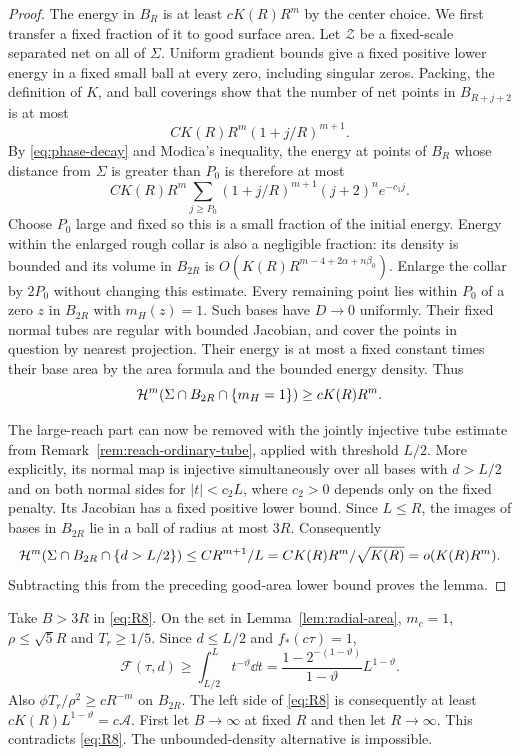 \begin{proof}
The energy in $B_R$ is at least $c K(R)R^m$ by the center choice.
We first transfer a fixed fraction of it to good surface area.
Let $\mathcal Z$ be a fixed-scale separated net on all of $\Sigma$.
Uniform gradient bounds give a fixed positive lower energy in a
fixed small ball at every zero, including singular zeros.
Packing, the definition of $K$, and ball coverings show that the
number of net points in $B_{R+j+2}$ is at most
\[
 C K(R)R^m(1+j/R)^{m+1}.
\]
By \eqref{eq:phase-decay} and Modica's inequality, the energy at
points of $B_R$ whose distance from $\Sigma$ is greater than $P_0$
is therefore at most
\[
 C K(R)R^m\sum_{j\ge P_0}
 (1+j/R)^{m+1}(j+2)^n e^{-c_1j}.
\]
Choose $P_0$ large and fixed so this is a small fraction of the
initial energy. Energy within the enlarged rough collar is also
a negligible fraction: its density is bounded and its volume in
$B_{2R}$ is $O(K(R)R^{m-4+2\alpha+n\beta_0})$.
Enlarge the collar by $2P_0$ without changing this estimate.
Every remaining point lies within $P_0$ of a zero $z$ in $B_{2R}$
with $m_H(z)=1$. Such bases have $D\to0$ uniformly. Their fixed
normal tubes are regular with bounded Jacobian, and cover the
points in question by nearest projection.
Their energy is at most a fixed constant times their base area
by the area formula and the bounded energy density. Thus
\[
 \mathcal H^m(\Sigma\cap B_{2R}\cap\{m_H=1\})\ge c K(R)R^m.
\]


The large-reach part can now be removed with the jointly injective tube
estimate from Remark~\ref{rem:reach-ordinary-tube}, applied with threshold
$L/2$. More explicitly, its normal map is injective simultaneously over
all bases with $d>L/2$ and on both normal sides for $|t|<c_2L$,
where $c_2>0$ depends only on the fixed penalty. Its Jacobian has a
fixed positive lower bound. Since $L\le R$, the images of bases in
$B_{2R}$ lie in a ball of radius at most $3R$. Consequently
\[
 \mathcal H^m(\Sigma\cap B_{2R}\cap\{d>L/2\})
 \le C R^{m+1}/L
 =C K(R)R^m/\sqrt{K(R)}=o(K(R)R^m).
\]
Subtracting this from the preceding good-area lower bound proves the
lemma.
\end{proof}

Take $B>3R$ in \eqref{eq:R8}. On the set in
Lemma~\ref{lem:radial-area}, $m_c=1$, $\rho\le\sqrt5R$ and
$T_r\ge1/5$. Since $d\le L/2$ and $f_*(c\tau)=1$,
\[
 \mathcal F(\tau,d)\ge\int_{L/2}^L t^{-\vartheta}\dd t
 =\frac{1-2^{-(1-\vartheta)}}{1-\vartheta}L^{1-\vartheta}.
\]
Also $\phi T_r/\rho^2\ge cR^{-m}$ on $B_{2R}$.
The left side of \eqref{eq:R8} is consequently at least
$cK(R)L^{1-\vartheta}=c\mathcal A$.
First let $B\to\infty$ at fixed $R$ and then let $R\to\infty$.
This contradicts \eqref{eq:R8}. The unbounded-density alternative
is impossible.

